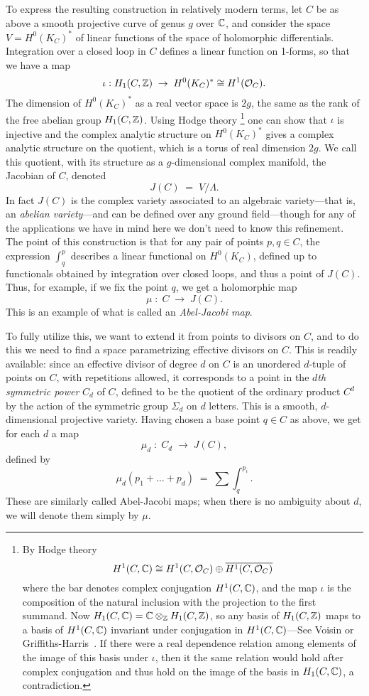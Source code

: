 To express the resulting construction in relatively modern terms, let $C$ be as above a smooth projective curve of genus $g$ over $\CC$, and consider the space $V = H^0(K_C)^*$ of linear functions of the space of holomorphic differentials. Integration over a closed loop in $C$ defines a linear function on 1-forms, so that we have a map
$$
\iota: H_1(C,\ZZ) \; \to \;  H^0(K_C)^* \cong H^1(\sO_C).
$$
The dimension of $H^0(K_C)^*$ as a real vector space is $2g$, the same as the rank of the free abelian group $H_1(C,\ZZ)$. 
Using  Hodge theory
\footnote{By Hodge theory 
$$
H^1(C, \CC) \cong H^1(C, \cO_C) \oplus \overline{H^1(C, \cO_C)}
$$
where the bar denotes complex conjugation $H^1(C, \CC)$, and the map $\iota$ is the composition of 
 the natural inclusion with the projection to the first summand.
 Now
$H_1(C,\CC) = \CC\otimes_\ZZ H_1(C,\ZZ)$, so any basis of $H_1(C,\ZZ)$ maps to a basis of 
 $H^1(C, \CC)$ invariant under conjugation in $H^1(C, \CC)$---See Voisin \cite{} or Griffiths-Harris~\cite{}. 
  If there were a real dependence relation among elements 
 of the image of this basis under $\iota$, then it the same relation would hold after complex
 conjugation and thus hold on the image of the basis in $H_1(C,\CC)$, a contradiction. 
}
one can show that $\iota$ is injective and the complex analytic structure on $H^0(K_C)^*$ gives a complex analytic structure on the quotient, which is a torus of real dimension $2g$.  We call this quotient, with its structure as a $g$-dimensional complex manifold, the Jacobian of $C$, denoted
$$
J(C) \; = \; V/\Lambda.
$$
In fact $J(C)$ is the complex variety associated to an algebraic variety---that is, an \emph{abelian variety}---and can be defined over any ground field---though for any of the applications we have in mind here we don't need to know this refinement. The point of this construction is that for any pair of points $p, q \in C$, the expression $\int_q^p$ describes a linear functional on $H^0(K_C)$, defined up to functionals obtained by integration over closed loops, and thus a point of $J(C)$. Thus, for example, if we fix the point $q$, we get a holomorphic map
$$
\mu \; : \; C \; \to \; J(C).
$$
This is an example of what is called an \emph{Abel-Jacobi map}.

To fully utilize this, we want to extend it from points  to divisors on $C$, and to do this we need to find a space parametrizing effective divisors on $C$. This is readily available: since an effective divisor of degree $d$ on $C$ is an unordered $d$-tuple of points on $C$, with repetitions allowed, it corresponds to a point in the \emph{$d$th symmetric power} $C_d$ of $C$, defined to be the quotient of the ordinary product $C^d$ by the action of the symmetric group $\Sigma_d$ on $d$ letters. This is a smooth, $d$-dimensional projective variety.  Having chosen a base point $q \in C$ as above, we get for each $d$ a map
$$
\mu_d \; : \; C_d \; \to \; J(C),
$$
defined by
$$
\mu_d(p_1 + \dots + p_d) \; = \; \sum \int_q^{p_i}.
$$
These are similarly called  Abel-Jacobi maps; when there is no ambiguity about $d$, we will denote them simply by $\mu$.

